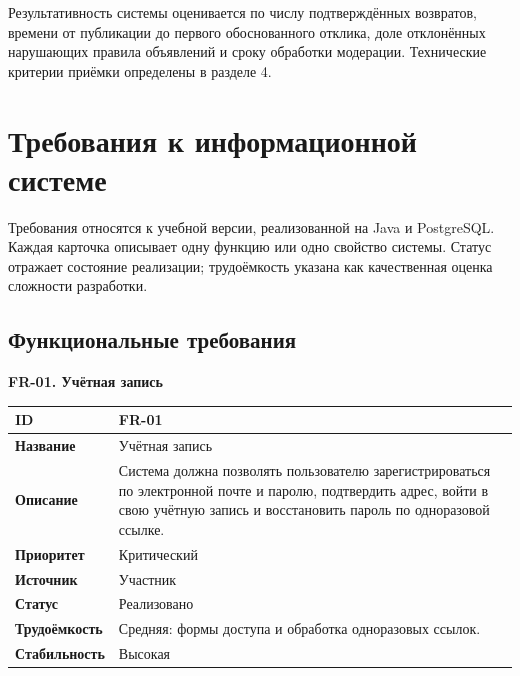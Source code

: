 Результативность системы оценивается по числу подтверждённых возвратов, времени от публикации до первого обоснованного отклика, доле отклонённых нарушающих правила объявлений и сроку обработки модерации. Технические критерии приёмки определены в разделе 4.

\clearpage
\section{Требования к информационной системе}

Требования относятся к учебной версии, реализованной на Java и Postgre\allowbreak{}SQL. Каждая карточка описывает одну функцию или одно свойство системы. Статус отражает состояние реализации; трудоёмкость указана как качественная оценка сложности разработки.

\FloatBarrier
{}
\subsection{Функциональные требования}

\noindent\begin{minipage}{\linewidth}
\fontsize{12}{14}\selectfont
\textbf{FR-01. Учётная запись}\par\smallskip
\setlength{\tablecontentwidth}{\dimexpr\linewidth-4\tabcolsep-3\arrayrulewidth\relax}
\begin{tabular}{|>{\RaggedRight\arraybackslash}p{0.25\tablecontentwidth}|>{\RaggedRight\arraybackslash}p{0.75\tablecontentwidth}|}
\hline
\textbf{ID} & FR-01 \\ \hline
\textbf{Название} & Учётная запись \\ \hline
\textbf{Описание} & Система должна позволять пользователю зарегистрироваться по электронной почте и паролю, подтвердить адрес, войти в свою учётную запись и восстановить пароль по одноразовой ссылке. \\ \hline
\textbf{Приоритет} & Критический \\ \hline
\textbf{Источник} & Участник \\ \hline
\textbf{Статус} & Реализовано \\ \hline
\textbf{Трудоёмкость} & Средняя: формы доступа и обработка одноразовых ссылок. \\ \hline
\textbf{Стабильность} & Высокая \\ \hline
\end{tabular}
\end{minipage}\par\medskip


